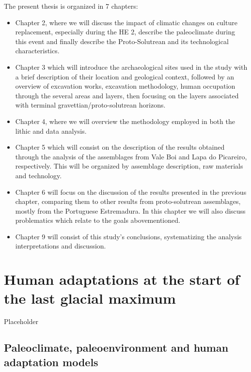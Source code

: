 \documentclass[12pt,twoside]{reedthesis}
\begin{document}
The present thesis is organized in 7 chapters:
\begin{itemize}
\item
  Chapter 2, where we will discuss the impact of climatic changes on culture replacement, especially during the HE 2, describe the paleoclimate during this event and finally describe the Proto-Solutrean and its technological characteristics.
\item
  Chapter 3 which will introduce the archaeological sites used in the study with a brief description of their location and geological context, followed by an overview of excavation works, excavation methodology, human occupation through the several areas and layers, then focusing on the layers associated with terminal gravettian/proto-solutrean horizons.
\item
  Chapter 4, where we will overview the methodology employed in both the lithic and data analysis.
\item
  Chapter 5 which will consist on the description of the results obtained through the analysis of the assemblages from Vale Boi and Lapa do Picareiro, respectively. This will be organized by assemblage description, raw materials and technology.
\item
  Chapter 6 will focus on the discussion of the results presented in the previous chapter, comparing them to other results from proto-solutrean assemblages, mostly from the Portuguese Estremadura. In this chapter we will also discuss problematics which relate to the goals abovementioned.
\item
  Chapter 9 will consist of this study's conclusions, systematizing the analysis interpretations and discussion.
\end{itemize}
\hypertarget{human-adaptations-at-the-start-of-the-last-glacial-maximum}{%
\chapter{Human adaptations at the start of the last glacial maximum}\label{human-adaptations-at-the-start-of-the-last-glacial-maximum}}

Placeholder

\hypertarget{paleoclimate-paleoenvironment-and-human-adaptation-models}{%
\section{Paleoclimate, paleoenvironment and human adaptation models}\label{paleoclimate-paleoenvironment-and-human-adaptation-models}}
\end{document}
